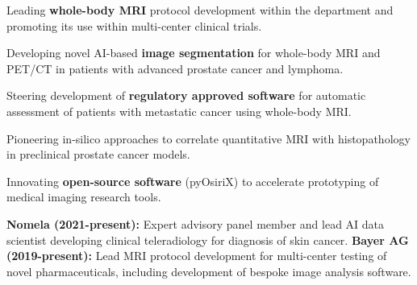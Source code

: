 \documentclass[]{mbcv}
\begin{document}
\begin{minipage}[t]{0.65\textwidth}
\vspace*{5pt}
\begin{tightemize}
\item Leading \textbf{whole-body MRI} protocol development within the department and promoting its use within multi-center clinical trials. 
\item Developing novel AI-based \textbf{image segmentation} for whole-body MRI and PET/CT in patients with advanced prostate cancer and lymphoma.
\item Steering development of \textbf{regulatory approved software} for automatic assessment of patients with metastatic cancer using whole-body MRI.
\item Pioneering in-silico approaches to correlate quantitative MRI with histopathology in preclinical prostate cancer models.
\item Innovating \textbf{open-source software} (pyOsiriX) to accelerate prototyping of medical imaging research tools.

\end{tightemize}

\sectionsep

\vspace*{5pt}
\textbf{Nomela (2021-present):} Expert advisory panel member and lead AI data scientist developing clinical   teleradiology for diagnosis of skin cancer.
\newline
\newline
\textbf{Bayer AG (2019-present):} Lead MRI protocol development for multi-center testing of novel pharmaceuticals, including development of bespoke image analysis software.


\end{minipage}

\newpage
\end{document}
